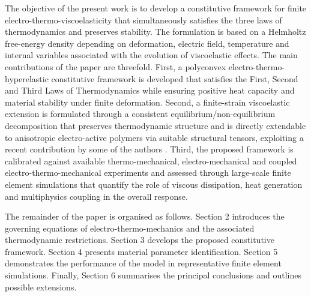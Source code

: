 The objective of the present work is to develop a constitutive framework for finite electro-thermo-viscoelasticity that simultaneously satisfies the three laws of thermodynamics and preserves stability. The formulation is based on a Helmholtz free-energy density depending on deformation, electric field, temperature and internal variables associated with the evolution of viscoelastic effects. The main contributions of the paper are threefold. First, a polyconvex electro-thermo-hyperelastic constitutive framework is developed that satisfies the First, Second and Third Laws of Thermodynamics while ensuring positive heat capacity and material stability under finite deformation. Second, a finite-strain viscoelastic extension is formulated through a consistent equilibrium/non-equilibrium decomposition that preserves thermodynamic structure and is directly extendable to anisotropic electro-active polymers via suitable structural tensors, exploiting a recent contribution by some of the authors \cite{Bonet_cross_product_2016}. Third, the proposed framework is calibrated against available thermo-mechanical, electro-mechanical and coupled electro-thermo-mechanical experiments and assessed through large-scale finite element simulations that quantify the role of viscous dissipation, heat generation and multiphysics coupling in the overall response.

The remainder of the paper is organised as follows. Section 2 introduces the governing equations of electro-thermo-mechanics and the associated thermodynamic restrictions. Section 3 develops the proposed constitutive framework. Section 4 presents material parameter identification. Section 5 demonstrates the performance of the model in representative finite element simulations. Finally, Section 6 summarises the principal conclusions and outlines possible extensions.


